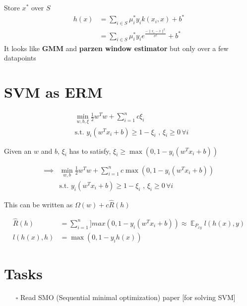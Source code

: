 \documentclass[11pt]{article}
\begin{document}
Store \(x^{*}\) over \(S\)
\begin{align*}
h(x) &= \sum_{i \in S} \mu_i^{*} y_i k(x_i, x) + b^{*} \\
     &= \sum_{i \in S}\mu_i^{*}y_i e^{\frac{- \lVert x_i - x \rVert^2}{\sigma^2}} + b^{*}
\end{align*}
It looks like \textbf{GMM} and \textbf{parzen window estimator} but only over a few datapoints

\section{SVM as ERM}
\label{sec:orgfc97e2b}

\begin{align*}
&\min_{w, b, \xi} \frac{1}{2} w^Tw + \sum_{i=1}^n c \xi_i \\
&\text{s.t. } y_i(w^Tx_i + b) \geq 1 - \xi_i \text{ ,    } \xi_i \geq 0 \,\forall i
 \end{align*}

Given an \(w\) and \(b\), \(\xi_i\) has to satisfy, \(\xi_i \geq \max(0, 1 - y_i(w^Tx_i + b))\)

\begin{align*}
\implies &\min_{w, b} \frac{1}{2} w^Tw + \sum_{i=1}^n c \max(0, 1 - y_i(w^Tx_i + b)) \\
&\text{s.t. } y_i(w^Tx_i + b) \geq 1 - \xi_i \text{ ,    } \xi_i \geq 0 \,\forall i
 \end{align*}

This can be written as \(\Omega(w) + c \hat{R}(h)\)

\begin{align*}
\hat{R}(h) &= \sum_{i=1}^n ]max(0, 1 - y_i(w^Tx_i + b)) \approx \mathop{\mathbb{E}}_{P_{xy}} l(h(x), y) \\
l(h(x), h) &= \max(0, 1 - y_ih(x))
\end{align*}

\section{Tasks}
\label{sec:orgfbd87ab}
\begin{itemize}
\item[{$\square$}] Read SMO (Sequential minimal optimization) paper [for solving SVM]
\end{itemize}
\end{document}
